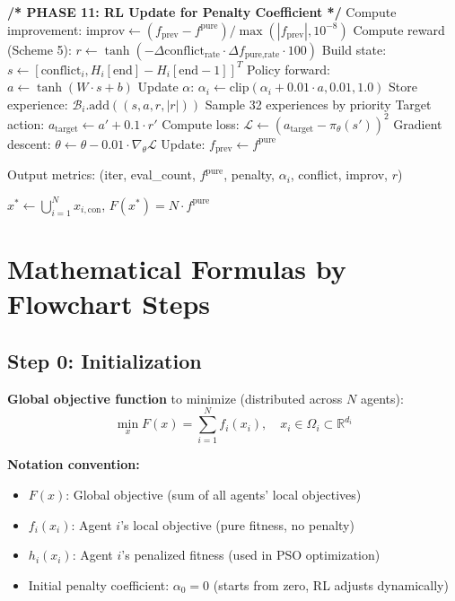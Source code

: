 \documentclass[11pt,a4paper]{article}
\begin{document}
\begin{algorithm}
\begin{algorithmic}[1]
    \State \textbf{/* PHASE 11: RL Update for Penalty Coefficient */}
    \State Compute improvement: $\text{improv} \gets (f_{\text{prev}} - f^{\text{pure}}) / \max(|f_{\text{prev}}|, 10^{-8})$
    \State Compute reward (Scheme 5): $r \gets \tanh\!\left(-\Delta\text{conflict}_{\text{rate}} \cdot \Delta f_{\text{pure,rate}} \cdot 100\right)$
    \State Build state: $s \gets [\text{conflict}_i, H_i[\text{end}] - H_i[\text{end}-1]]^T$ 
    \State Policy forward: $a \gets \tanh(W \cdot s + b)$
    \State Update $\alpha$: $\alpha_i \gets \text{clip}(\alpha_i + 0.01 \cdot a, 0.01, 1.0)$
    \State Store experience: $\mathcal{B}_i.\text{add}((s, a, r, |r|))$ 
        \State Sample 32 experiences by priority
            \State Target action: $a_{\text{target}} \gets a' + 0.1 \cdot r'$
            \State Compute loss: $\mathcal{L} \gets (a_{\text{target}} - \pi_\theta(s'))^2$
            \State Gradient descent: $\theta \gets \theta - 0.01 \cdot \nabla_\theta \mathcal{L}$
        \EndFor
    \EndIf
    \State Update: $f_{\text{prev}} \gets f^{\text{pure}}$
    
        \State Output metrics: (iter, eval\_count, $f^{\text{pure}}$, penalty, $\alpha_i$, conflict, improv, $r$)
    \EndIf
\EndWhile

\State \Return $x^* \gets \bigcup_{i=1}^N x_{i,\text{con}}$, $F(x^*) = N \cdot f^{\text{pure}}$

\end{algorithmic}
\end{algorithm}

\section{Mathematical Formulas by Flowchart Steps}

\subsection{Step 0: Initialization}
\textbf{Global objective function} to minimize (distributed across $N$ agents):
\begin{equation}
\min_{x} F(x) = \sum_{i=1}^N f_i(x_i), \quad x_i \in \Omega_i \subset \mathbb{R}^{d_i}
\end{equation}

\textbf{Notation convention:}
\begin{itemize}
    \item $F(x)$: Global objective (sum of all agents' local objectives)
    \item $f_i(x_i)$: Agent $i$'s local objective (pure fitness, no penalty)
    \item $h_i(x_i)$: Agent $i$'s penalized fitness (used in PSO optimization)
    \item Initial penalty coefficient: $\alpha_0 = 0$ (starts from zero, RL adjusts dynamically)
\end{itemize}
\end{document}
